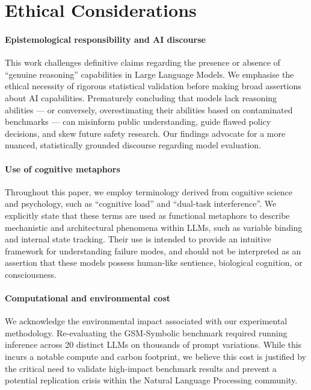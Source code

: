 \documentclass[11pt]{article}
\begin{document}
\section*{Ethical Considerations}

\paragraph{Epistemological responsibility and AI discourse}
This work challenges definitive claims regarding the presence or absence of ``genuine reasoning'' capabilities in Large Language Models. We emphasise the ethical necessity of rigorous statistical validation before making broad assertions about AI capabilities. Prematurely concluding that models lack reasoning abilities  --- or conversely, overestimating their abilities based on contaminated benchmarks --- can misinform public understanding, guide flawed policy decisions, and skew future safety research. Our findings advocate for a more nuanced, statistically grounded discourse regarding model evaluation.

\paragraph{Use of cognitive metaphors}
Throughout this paper, we employ terminology derived from cognitive science and psychology, such as ``cognitive load'' and ``dual-task interference''. We explicitly state that these terms are used as functional metaphors to describe mechanistic and architectural phenomena within LLMs, such as variable binding and internal state tracking. Their use is intended to provide an intuitive framework for understanding failure modes, and should not be interpreted as an assertion that these models possess human-like sentience, biological cognition, or consciousness.

\paragraph{Computational and environmental cost}
We acknowledge the environmental impact associated with our experimental methodology. Re-evaluating the GSM-Symbolic benchmark required running inference across 20 distinct LLMs on thousands of prompt variations. While this incurs a notable compute and carbon footprint, we believe this cost is justified by the critical need to validate high-impact benchmark results and prevent a potential replication crisis within the Natural Language Processing community.
\end{document}
